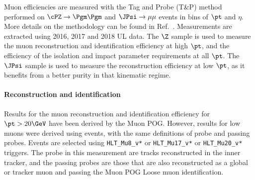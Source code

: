 
Muon efficiencies are measured with the Tag and Probe (T\&P) method performed on
$\cPZ \to \Pgm\Pgm$ and $\JPsi\to\mu\mu$ events in bins of $\pt$ and $\eta$. More
details on the methodology can be found in Ref.~\cite{AN-15-277}. Measurements are extracted using 2016, 2017 and 2018 UL data.
%
The $\Z$ sample is used to measure the muon reconstruction and identification efficiency at high $\pt$,
and the efficiency of the isolation and impact parameter requirements at all $\pt$.
%
The $\JPsi$ sample is used to measure the reconstruction efficiency at low $\pt$,
as it benefits from a better purity in that kinematic regime. 

\paragraph*{Reconstruction and identification}

Results for the muon reconstruction and identification efficiency for $\pt > 20\GeV$
have been derived by the Muon POG.
However, results for low \pt muons were derived using \JPsi events, with the same definitions of probe and passing probes. Events are selected using \verb=HLT_Mu8_v*= or \verb=HLT_Mu17_v*= or \verb=HLT_Mu20_v*= triggers. The probe in this measurement are tracks reconstructed in the inner tracker, and
the passing probes are those that are also reconstructed as a global or tracker muon 
and passing the Muon POG Loose muon identification.
%

